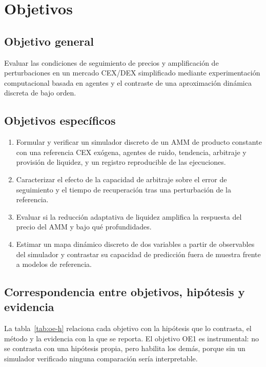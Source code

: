 \chapter{Objetivos}
\label{cap:objetivos}

\section{Objetivo general}

Evaluar las condiciones de seguimiento de precios y amplificación de perturbaciones en un mercado CEX/DEX simplificado mediante experimentación computacional basada en agentes y el contraste de una aproximación dinámica discreta de bajo orden.

\section{Objetivos específicos}

\begin{enumerate}[label=\textbf{OE\arabic*.}, leftmargin=3em]
  \item Formular y verificar un simulador discreto de un AMM de producto constante con una referencia CEX exógena, agentes de ruido, tendencia, arbitraje y provisión de liquidez, y un registro reproducible de las ejecuciones.
  \item Caracterizar el efecto de la capacidad de arbitraje sobre el error de seguimiento y el tiempo de recuperación tras una perturbación de la referencia.
  \item Evaluar si la reducción adaptativa de liquidez amplifica la respuesta del precio del AMM y bajo qué profundidades.
  \item Estimar un mapa dinámico discreto de dos variables a partir de observables del simulador y contrastar su capacidad de predicción fuera de muestra frente a modelos de referencia.
\end{enumerate}

\section{Correspondencia entre objetivos, hipótesis y evidencia}

La tabla~\ref{tab:oe-h} relaciona cada objetivo con la hipótesis que lo contrasta, el método y la evidencia con la que se reporta. El objetivo OE1 es instrumental: no se contrasta con una hipótesis propia, pero habilita los demás, porque sin un simulador verificado ninguna comparación sería interpretable.

